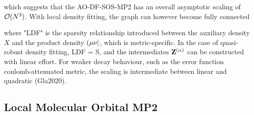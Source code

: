 \noindent which suggests that the AO-DF-SOS-MP2 has an overall asymptotic scaling of $\mathcal{O}(N^{3})$. With local density fitting, the graph can however become fully connected
\begin{center}
\end{center}

\noindent where "LDF" is the sparsity relationship introduced between the auxiliary density $X$ and the product density $\left( \mu\nu \right\rvert$, which is metric-specific. In the case of quasi-robust density fitting, LDF = S, and the intermediates $\mathbf{Z}^{(\alpha)}$ can be constructed with linear effort. For weaker decay behaviour, such as the error function coulomb-attenuated metric, the scaling is intermediate between linear and quadratic (Gla2020). 



\subsection{Local Molecular Orbital MP2}

